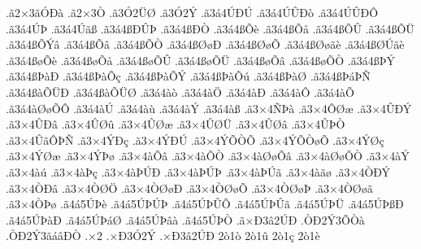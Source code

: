 {.^^e32^^d73^^e3^^d3^^d0^^e0
.^^e32^^d73^^d2
.^^e33^^d32^^dc^^d8
.^^e33^^d32^^dd
.^^e33^^e14^^da^^d0^^da
.^^e33^^e14^^da^^db^^d0^^f2
.^^e33^^e14^^da^^db^^d0^^d4
.^^e33^^e14^^da^^de
.^^e33^^e14^^da^^e3^^df
.^^e33^^e14^^df^^d0^^db^^de
.^^e33^^e14^^df^^d0^^d2
.^^e33^^e14^^df^^d5^^e8
.^^e33^^e14^^df^^d5^^e5
.^^e33^^e14^^df^^d5^^db
.^^e33^^e14^^df^^d5^^dc
.^^e33^^e14^^df^^d5^^dd^^e2
.^^e33^^e14^^df^^d5^^e2
.^^e33^^e14^^df^^d5^^d2
.^^e33^^e14^^df^^d8^^f8^^d0
.^^e33^^e14^^df^^d8^^f8^^d5
.^^e33^^e14^^df^^d8^^f8^^e3^^e8
.^^e33^^e14^^df^^d8^^da^^e3^^e8
.^^e33^^e14^^df^^f8^^d5^^e8
.^^e33^^e14^^df^^f8^^d5^^e5
.^^e33^^e14^^df^^f8^^d5^^db
.^^e33^^e14^^df^^f8^^d5^^dc
.^^e33^^e14^^df^^f8^^d5^^e2
.^^e33^^e14^^df^^f8^^d5^^d2
.^^e33^^e14^^df^^de^^dd
.^^e33^^e14^^df^^de^^e0^^d0
.^^e33^^e14^^df^^de^^e0^^d5^^e7
.^^e33^^e14^^df^^de^^e0^^d5^^dd
.^^e33^^e14^^df^^de^^e0^^d5^^fa
.^^e33^^e14^^df^^de^^e0^^d8
.^^e33^^e14^^df^^de^^e1^^de^^d1
.^^e33^^e14^^df^^e0^^d5^^dc^^d0
.^^e33^^e14^^df^^e0^^d5^^dc^^d8
.^^e33^^e14^^e0^^f2
.^^e33^^e14^^e0^^d6
.^^e33^^e14^^e0^^d0
.^^e33^^e14^^e0^^d4
.^^e33^^e14^^e0^^d5
.^^e33^^e14^^e0^^d8^^f8^^d5^^d4
.^^e33^^e14^^e0^^da
.^^e33^^e14^^e0^^f9
.^^e33^^e14^^e0^^dd
.^^e33^^e14^^e0^^df
.^^e33^^d74^^d1^^de^^e0
.^^e33^^d74^^d4^^d8^^e6
.^^e33^^d74^^db^^d0^^dd
.^^e33^^d74^^db^^d0^^e2
.^^e33^^d74^^db^^d8^^fb
.^^e33^^d74^^db^^d8^^e6
.^^e33^^d74^^db^^d8^^dc
.^^e33^^d74^^db^^d8^^e2
.^^e33^^d74^^db^^de^^d2
.^^e33^^d74^^db^^e3^^d4^^de^^d1
.^^e33^^d74^^dd^^d0^^e7
.^^e33^^d74^^dd^^d0^^da
.^^e33^^d74^^dd^^d5^^d2^^d5
.^^e33^^d74^^dd^^d5^^d2^^f8^^d5
.^^e33^^d74^^dd^^d8^^e7
.^^e33^^d74^^dd^^d8^^e6
.^^e33^^d74^^dd^^de^^f8
.^^e33^^d74^^e0^^d5^^e2
.^^e33^^d74^^e0^^d5^^d2
.^^e33^^d74^^e0^^d8^^f8^^d5^^e2
.^^e33^^d74^^e0^^d8^^f8^^d5^^d2
.^^e33^^d74^^e0^^dd
.^^e33^^d74^^e0^^fa
.^^e33^^d74^^e0^^de^^e7
.^^e33^^d74^^e0^^de^^da^^d0
.^^e33^^d74^^e0^^de^^da^^de
.^^e33^^d74^^e0^^de^^da^^e3
.^^e33^^d74^^e0^^e3^^f8
.^^e33^^d74^^d2^^d0^^dd
.^^e33^^d74^^d2^^d0^^e2
.^^e33^^d74^^d2^^d8^^d6
.^^e33^^d74^^d2^^d8^^f8^^d0
.^^e33^^d74^^d2^^d8^^f8^^d5
.^^e33^^d74^^d2^^d8^^f8^^de
.^^e33^^d74^^d2^^d8^^f8^^e3
.^^e33^^d74^^d2^^de^^f8
.^^e34^^e15^^da^^de^^e8
.^^e34^^e15^^da^^de^^da^^de
.^^e34^^e15^^da^^de^^db^^d5
.^^e34^^e15^^da^^de^^db^^e3
.^^e34^^e15^^da^^de^^dc
.^^e34^^e15^^da^^de^^df^^d0
.^^e34^^e15^^da^^de^^e0^^d0
.^^e34^^e15^^da^^de^^e1^^d8
.^^e34^^e15^^da^^de^^e2^^e0
.^^e34^^e15^^da^^de^^d2
.^^e3^^d7^^d03^^e22^^da^^d0
.^^d2^^d02^^dd3^^d5^^d2^^e0
.^^d2^^d02^^dd3^^e3^^e1^^e2^^d0^^d2
.^^d72
.^^d7^^d03^^d32^^dd
.^^d7^^d03^^e22^^da^^d0
2^^f21^^f2
2^^f21^^fb
2^^f21^^e7
2^^f21^^e8
}
